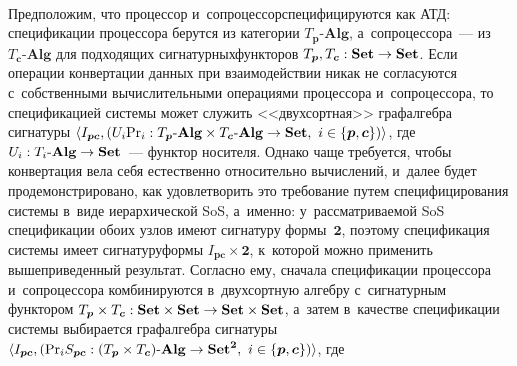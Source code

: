 \begin{multicols}{2}
\vspace*{-2pt}

  \begin{center}  
    \mbox{%
\epsfxsize=35.684mm
}

\end{center}

\vspace*{-2pt}
 
  
  Предположим, что процессор и~сопроцессор\linebreak специфицируются как АТД: 
спецификации процессора берутся из категории $T_{\boldsymbol{p}}\mbox{-}\mathbf{Alg}$, 
а~сопроцессора~--- из $T_{\boldsymbol{c}}\mbox{-}\mathbf{Alg}$ для подходящих 
сигнатурных\linebreak функторов $T_{\boldsymbol{p}}, T_{\boldsymbol{c}} : \mathbf{Set}\hm\to \mathbf{Set}$. Если 
операции конвертации данных при взаимодействии никак не согласуются 
с~собственными вы\-чис\-ли\-тель\-ны\-ми операциями процессора и~сопроцессора, то 
спецификацией сис\-те\-мы может служить <<двухсортная>> графалгебра 
сигнатуры $\langle I_{\boldsymbol{pc}}, (U_i \mathrm{Pr}_i : T_{\boldsymbol{p}}\mbox{-}\mathbf{Alg} 
\hm\times T_{\boldsymbol{c}}\mbox{-}\mathbf{Alg}\hm\to 
\mathbf{Set},\ i\hm\in \{\boldsymbol{p}, \boldsymbol{c}\})\rangle$, где $U_i : 
T_i\mbox{-}\mathbf{Alg} \hm\to \mathbf{Set}$~--- функтор носителя. Однако 
чаще \mbox{требуется}, чтобы конвертация вела себя естественно относительно 
вы\-чис\-лений, и~далее будет продемонстрировано, как удовле\-тво\-рить это 
требование путем специфицирования сис\-те\-мы в~виде иерархической SoS, 
а~именно: у~рас\-смат\-ри\-ва\-емой SoS спецификации обоих узлов имеют 
сигнатуру формы~$\boldsymbol{2}$, поэтому спецификация сис\-те\-мы имеет 
сигнатуру\linebreak формы $I_{\boldsymbol{pc}}\times \boldsymbol{2}$, к~которой можно применить 
вышеприведенный результат. Согласно ему, сначала спецификации процессора
 и~сопроцессора комбинируются в~двухсортную ал\-геб\-ру с~сигнатурным\linebreak 
функтором $T_{\boldsymbol{p}}\times T_{\boldsymbol{c}}: \mathbf{Set}\times \mathbf{Set} \hm\to 
\mathbf{Set}\times \mathbf{Set}$, а~затем в~качестве спецификации сис\-те\-мы 
выбирается граф\-ал\-геб\-ра сигнатуры $\langle I_{\boldsymbol{pc}}, (\mathrm{Pr}_i S_{\boldsymbol{pc}} : 
(T_{\boldsymbol{p}}\hm\times 
T_{\boldsymbol{c}})\mbox{-}\mathbf{Alg} \hm\to \mathbf{Set}^{\boldsymbol{2}},\ i\hm\in 
\{\boldsymbol{p}, \boldsymbol{c}\} )\rangle$, где


\end{multicols}
